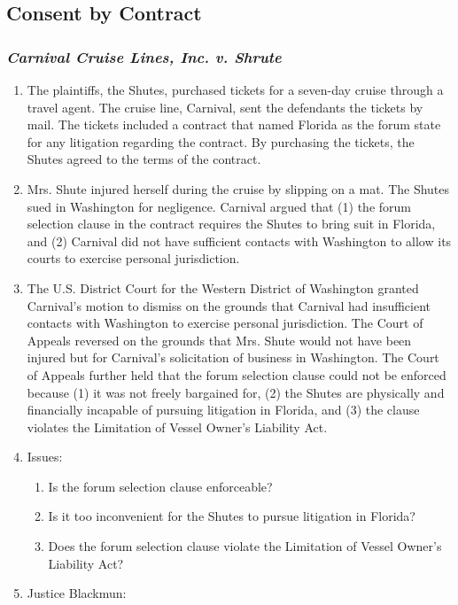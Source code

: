 \subsection{Consent by Contract}

\subsubsection{\emph{Carnival Cruise Lines, Inc. v. Shrute}}

\begin{enumerate}
    \item The plaintiffs, the Shutes, purchased tickets for a seven-day cruise through a travel agent. The cruise line, Carnival, sent the defendants the tickets by mail. The tickets included a contract that named Florida as the forum state for any litigation regarding the contract. By purchasing the tickets, the Shutes agreed to the terms of the contract.
    \item Mrs. Shute injured herself during the cruise by slipping on a mat. The Shutes sued in Washington for negligence. Carnival argued that (1) the forum selection clause in the contract requires the Shutes to bring suit in Florida, and (2) Carnival did not have sufficient contacts with Washington to allow its courts to exercise personal jurisdiction.
    \item The U.S. District Court for the Western District of Washington granted Carnival's motion to dismiss on the grounds that Carnival had insufficient contacts with Washington to exercise personal jurisdiction. The Court of Appeals reversed on the grounds that Mrs. Shute would not have been injured but for Carnival's solicitation of business in Washington. The Court of Appeals further held that the forum selection clause could not be enforced because (1) it was not freely bargained for, (2) the Shutes are physically and financially incapable of pursuing litigation in Florida, and (3) the clause violates the Limitation of Vessel Owner's Liability Act.
    \item Issues:
    \begin{enumerate}
        \item Is the forum selection clause enforceable?
        \item Is it too inconvenient for the Shutes to pursue litigation in Florida?
        \item Does the forum selection clause violate the Limitation of Vessel Owner's Liability Act?
    \end{enumerate}
    \item Justice Blackmun:

\end{enumerate}
